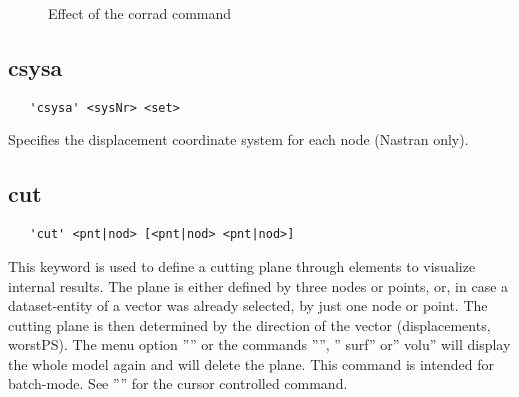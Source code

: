 \documentclass{article}
\begin{document}
\begin{figure}[h]
\caption{\label{corradp} Effect of the corrad command }
\end{figure}

\subsection{\label{csysa}csysa}
\begin{verbatim}
   'csysa' <sysNr> <set>                                                               
\end{verbatim}
Specifies the displacement coordinate system for each node (Nastran only).

\subsection{\label{cut}cut}
\begin{verbatim}
   'cut' <pnt|nod> [<pnt|nod> <pnt|nod>]
\end{verbatim}
This keyword is used to define a cutting plane through elements to visualize internal results. The plane is either defined by three nodes or points, or, in case a dataset-entity of a vector was already selected, by just one node or point. The cutting plane is then determined by the direction of the vector (displacements, worstPS). The menu option '''' or the commands '''', '' surf'' or'' volu'' will display the whole model again and will delete the plane. This command is intended for batch-mode. See '''' for the cursor controlled command.
\end{document}
